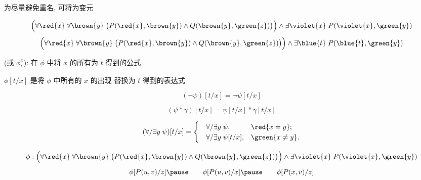\begin{frame}{}
  \begin{definition}[改名 (Rename)]
    为尽量避免重名, 可将为变元
  \end{definition}

  \pause

  \pause
  \[
    \Big(\forall \red{x}\; \forall \brown{y}\; \big(P(\red{x}, \brown{y})
      \land Q(\brown{y}, \green{z})\big)\Big) \land
      \exists \violet{x}\; P(\violet{x}, \green{y})
  \]
  \pause
  \[
    \Big(\forall \red{x}\; \forall \brown{y}\; \big(P(\red{x}, \brown{y})
      \land Q(\brown{y}, \green{z})\big)\Big) \land
      \exists \blue{t}\; P(\blue{t}, \green{y})
  \]
\end{frame}

\begin{frame}{}
  \begin{center}
    \violet{$\phi[t/x]$} (或 $\phi^{x}_{t}$):
      在 $\phi$ 中将 $x$ 的所有为 $t$ 得到的公式
  \end{center}

  \begin{definition}
    \begin{description}
      \setlength{\itemsep}{6pt}
      \item[$\phi$ 是原子公式:]
        $\phi[t/x]$ 是将 $\phi$ 中所有的 $x$ 的出现
        替换为 $t$ 得到的表达式
      \item[$\phi = \lnot\psi$:]
        \[
          (\lnot\psi)[t/x] = \lnot\psi[t/x]
        \]
      \item[$\phi = \psi \ast \gamma$:]
        \[
          (\psi \ast \gamma)[t/x] = \psi[t/x] \ast \gamma[t/x]
        \]
      \item[$\phi = \forall/\exists y\; \psi$:]
        \[
          (\forall/\exists y\; \psi)[t/x] =
          \begin{cases}
            \quad\forall/\exists y\; \psi, & \red{x = y}; \\
            \quad\forall/\exists y\; \psi[t/x], & \green{x \neq y}.
          \end{cases}
        \]
    \end{description}
  \end{definition}

  \pause
  \[
    \phi: \Big(\forall \red{x}\; \forall \brown{y}\; \big(P(\red{x}, \brown{y})
      \land Q(\brown{y}, \green{z})\big)\Big) \land
      \exists \violet{x}\; P(\violet{x}, \green{y})
  \]
  \pause
  \vspace{-0.30cm}
  \[
    \phi[P(u, v)/z] \pause\qquad
    \phi[P(u, v)/x] \pause\qquad
    \phi[P(x, v)/z]
  \]
\end{frame}

